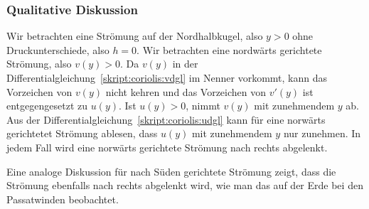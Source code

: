 \subsubsection{Qualitative Diskussion}
Wir betrachten eine Strömung auf der Nordhalbkugel, also $y>0$ ohne
Druckunterschiede, also $h=0$.
Wir betrachten eine nordwärts gerichtete Strömung, also $v(y)>0$.
Da $v(y)$
in der Differentialgleichung~\eqref{skript:coriolis:vdgl}
im Nenner vorkommt, kann das Vorzeichen von $v(y)$ nicht kehren
und das Vorzeichen von $v'(y)$ ist entgegengesetzt zu $u(y)$.
Ist $u(y)>0$, nimmt $v(y)$ mit zunehmendem $y$ ab.
Aus der Differentialgleichung~\eqref{skript:coriolis:udgl} kann für
eine norwärts gerichtetet Strömung ablesen, dass $u(y)$ mit zunehmendem
$y$ nur zunehmen.
In jedem Fall wird eine norwärts gerichtete Strömung nach rechts
abgelenkt.

Eine analoge Diskussion für nach Süden gerichtete Strömung zeigt, dass
die Strömung ebenfalls nach rechts abgelenkt wird, wie man das auf
der Erde bei den Passatwinden beobachtet.

